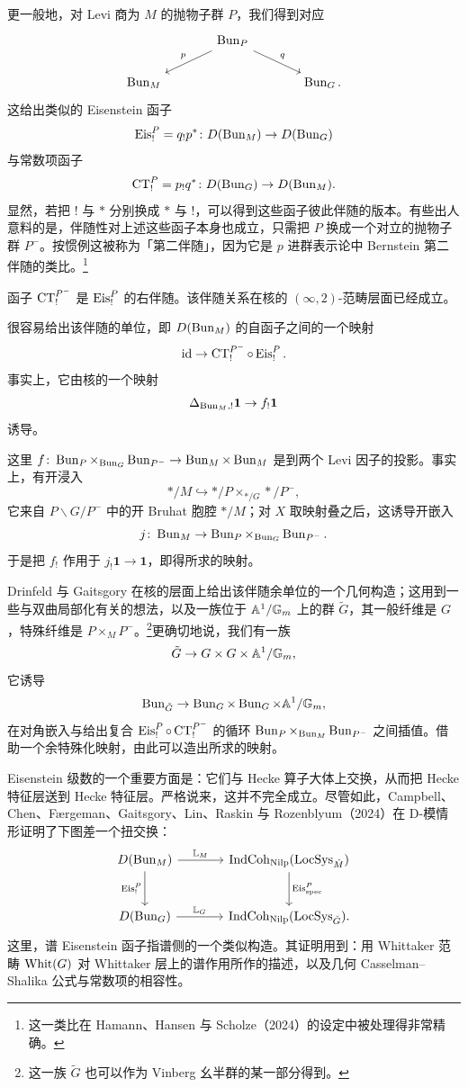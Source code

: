 更一般地，对 Levi 商为 $M$ 的抛物子群 $P$，我们得到对应
\[
\begin{tikzcd}[column sep=large]
& \Bun_P \arrow[dl,"p"'] \arrow[dr,"q"] & \\
\Bun_M & & \Bun_G.
\end{tikzcd}
\]
这给出类似的 Eisenstein 函子
\[
\operatorname{Eis}^{P}_{!}=q_{!}p^{*}\colon D(\operatorname{Bun}_M)\to D(\operatorname{Bun}_G)
\]
与常数项函子
\[
\operatorname{CT}^{P}_{!}=p_{!}q^{*}\colon D(\operatorname{Bun}_G)\to D(\operatorname{Bun}_M).
\]
显然，若把 $!$ 与 $*$ 分别换成 $*$ 与 $!$，可以得到这些函子彼此伴随的版本。有些出人意料的是，伴随性对上述这些函子本身也成立，只需把 $P$ 换成一个对立的抛物子群 $P^{-}$。按惯例这被称为「第二伴随」，因为它是 $p$ 进群表示论中 Bernstein 第二伴随的类比。\footnote{这一类比在 Hamann、Hansen 与 Scholze（2024）的设定中被处理得非常精确。}

\begin{theorem}
函子 $\operatorname{CT}^{P^{-}}_{!}$ 是 $\operatorname{Eis}^{P}_{!}$ 的右伴随。该伴随关系在核的 $(\infty,2)$-范畴层面已经成立。
\end{theorem}

很容易给出该伴随的单位，即 $D(\operatorname{Bun}_M)$ 的自函子之间的一个映射
\[
\mathrm{id}\to\operatorname{CT}^{P^{-}}_{!}\circ\operatorname{Eis}^{P}_{!}.
\]
事实上，它由核的一个映射
\[
\Delta_{\operatorname{Bun}_M,!}\mathbf{1}\to f_{!}\mathbf{1}
\]
诱导。

这里 $f\colon\operatorname{Bun}_P\times_{\operatorname{Bun}_G}\operatorname{Bun}_{P^{-}}\to\operatorname{Bun}_M\times\operatorname{Bun}_M$ 是到两个 Levi 因子的投影。事实上，有开浸入
\[
*/M\hookrightarrow */P\times_{*/G}*/P^{-},
\]
它来自 $P\backslash G/P^{-}$ 中的开 Bruhat 胞腔 $*/M$；对 $X$ 取映射叠之后，这诱导开嵌入
\[
j\colon\operatorname{Bun}_M\to\operatorname{Bun}_P\times_{\operatorname{Bun}_G}\operatorname{Bun}_{P^{-}}.
\]
于是把 $f_{!}$ 作用于 $j_{!}\mathbf{1}\to\mathbf{1}$，即得所求的映射。

Drinfeld 与 Gaitsgory 在核的层面上给出该伴随余单位的一个几何构造；这用到一些与双曲局部化有关的想法，以及一族位于 $\mathbb{A}^{1}/\mathbb{G}_m$ 上的群 $\tilde G$，其一般纤维是 $G$，特殊纤维是 $P\times_M P^{-}$。\footnote{这一族 $\tilde G$ 也可以作为 Vinberg 幺半群的某一部分得到。}更确切地说，我们有一族
\[
\tilde G\to G\times G\times\mathbb{A}^{1}/\mathbb{G}_m,
\]
它诱导
\[
\operatorname{Bun}_{\tilde G}\to\operatorname{Bun}_G\times\operatorname{Bun}_G\times\mathbb{A}^{1}/\mathbb{G}_m,
\]
在对角嵌入与给出复合 $\operatorname{Eis}^{P}_{!}\circ\operatorname{CT}^{P^{-}}_{!}$ 的循环 $\operatorname{Bun}_P\times_{\operatorname{Bun}_M}\operatorname{Bun}_{P^{-}}$ 之间插值。借助一个余特殊化映射，由此可以造出所求的映射。

Eisenstein 级数的一个重要方面是：它们与 Hecke 算子大体上交换，从而把 Hecke 特征层送到 Hecke 特征层。严格说来，这并不完全成立。尽管如此，Campbell、Chen、Færgeman、Gaitsgory、Lin、Raskin 与 Rozenblyum（2024）在 D-模情形证明了下图差一个扭交换：
\[
\begin{tikzcd}[column sep=large,row sep=large]
D(\Bun_M) \arrow[r,"\mathbb{L}_M"] \arrow[d,"\Eis^{P}_{!}"'] & \IndCoh_{\Nilp}(\LocSys_{\Md}) \arrow[d,"\Eis^{P}_{\mathrm{spec}}"] \\
D(\Bun_G) \arrow[r,"\mathbb{L}_G"] & \IndCoh_{\Nilp}(\LocSys_{\Gd}).
\end{tikzcd}
\]
这里，谱 Eisenstein 函子指谱侧的一个类似构造。其证明用到：用 Whittaker 范畴 $\operatorname{Whit}(G)$ 对 Whittaker 层上的谱作用所作的描述，以及几何 Casselman--Shalika 公式与常数项的相容性。

